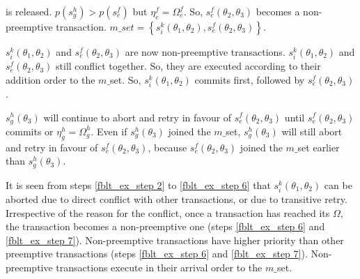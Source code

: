 \begin{compactenum}
is released. $p(s_{g}^{h})>p(s_{e}^{f})$ but $\eta_{e}^{f}=\Omega_{e}^{f}$.
So, $s_{e}^{f}(\theta_{2},\theta_{3})$ becomes a non-preemptive transaction.
$m\_set=\left\{ s_{i}^{k}(\theta_{1},\theta_{2}),s_{e}^{f}(\theta_{2},\theta_{3})\right\} $.
%
\item $s_{i}^{k}(\theta_{1},\theta_{2})$ and $s_{e}^{f}(\theta_{2},\theta_{3})$
are now non-preemptive transactions. $s_{i}^{k}(\theta_{1},\theta_{2})$
and $s_{e}^{f}(\theta_{2},\theta_{3})$ still conflict together. So,
they are executed according to their addition order to the $m\_$set.
So, $s_{i}^{k}(\theta_{1},\theta_{2})$ commits first, followed by $s_{e}^{f}(\theta_{2},\theta_{3})$.
%
\item $s_{g}^{h}(\theta_{3})$ will continue to abort and retry in favour
of $s_{e}^{f}(\theta_{2},\theta_{3})$ until $s_{e}^{f}(\theta_{2},\theta_{3})$
commits or $\eta_{g}^{h}=\Omega_{g}^{h}$. Even if $s_{g}^{h}(\theta_{3})$
joined the $m\_$set, $s_{g}^{h}(\theta_{3})$ will still abort and retry
in favour of $s_{e}^{f}(\theta_{2},\theta_{3})$, because $s_{e}^{f}(\theta_{2},\theta_{3})$ joined the $m\_$set earlier than $s_{g}^{h}(\theta_{3})$.
\end{compactenum}
%
It is seen from steps \ref{fblt_ex_step 2} to \ref{fblt_ex_step 6}
that $s_{i}^{k}(\theta_{1},\theta_{2})$ can be aborted due to direct
conflict with other transactions, or due to transitive retry. Irrespective of 
the reason for the conflict, once a transaction has reached its $\Omega$, the transaction becomes a non-preemptive one
(steps \ref{fblt_ex_step 6} and \ref{fblt_ex_step 7}). Non-preemptive
transactions have higher priority than other preemptive transactions
(steps \ref{fblt_ex_step 6} and \ref{fblt_ex_step 7}). Non-preemptive
transactions execute in their arrival order to the $m\_$set.
%
